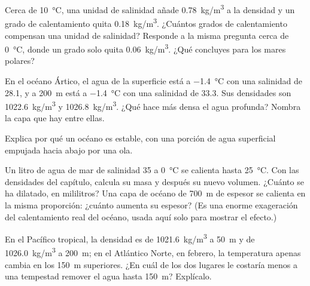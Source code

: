 \begin{exercise}[$\star\star$]\label{exo:g10:layered-ocean:9}
Cerca de \qty{10}{\degreeCelsius}, una unidad de salinidad añade
\qty{0.78}{kg/m^3} a la densidad y un grado de calentamiento quita
\qty{0.18}{kg/m^3}. ¿Cuántos grados de calentamiento compensan una unidad de
salinidad? Responde a la misma pregunta cerca de \qty{0}{\degreeCelsius},
donde un grado solo quita \qty{0.06}{kg/m^3}. ¿Qué concluyes para los mares
polares?
\end{exercise}

\begin{exercise}[$\star\star$]\label{exo:g10:layered-ocean:10}
En el océano Ártico, el agua de la superficie está a
\qty{-1.4}{\degreeCelsius} con una salinidad de 28.1, y a \qty{200}{m} está
a \qty{-1.4}{\degreeCelsius} con una salinidad de 33.3. Sus densidades son
\qty{1022.6}{kg/m^3} y \qty{1026.8}{kg/m^3}. ¿Qué hace más densa el agua
profunda? Nombra la capa que hay entre ellas.
\end{exercise}

\begin{exercise}[$\star\star$]\label{exo:g10:layered-ocean:11}
Explica por qué un océano  es estable, con una porción de agua
superficial empujada hacia abajo por una ola.
\end{exercise}

\begin{exercise}[$\star\star\star$]\label{exo:g10:layered-ocean:12}
Un litro de agua de mar de salinidad 35 a \qty{0}{\degreeCelsius} se calienta
hasta \qty{25}{\degreeCelsius}. Con las densidades del capítulo, calcula su
masa y después su nuevo volumen. ¿Cuánto se ha dilatado, en mililitros? Una
capa de océano de \qty{700}{m} de espesor se calienta en la misma proporción:
¿cuánto aumenta su espesor? (Es una enorme exageración del calentamiento real
del océano, usada aquí solo para mostrar el efecto.)
\end{exercise}

\begin{exercise}[$\star\star\star$]\label{exo:g10:layered-ocean:13}
En el Pacífico tropical, la densidad es de \qty{1021.6}{kg/m^3} a
\qty{50}{m} y de \qty{1026.0}{kg/m^3} a \qty{200}{m}; en el Atlántico Norte,
en febrero, la temperatura apenas cambia en los \qty{150}{m} superiores. ¿En
cuál de los dos lugares le costaría menos a una tempestad remover el agua
hasta \qty{150}{m}? Explícalo.
\end{exercise}

